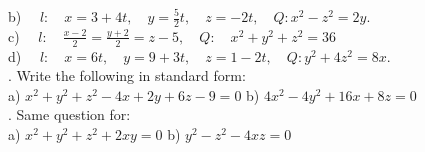 \documentclass[11pts]{amsbook}
\begin{document}
\indent b) $\quad\mathit{l}: \quad x=3+4t,\quad y=\frac{5}{2}t,\quad z=-2t,\quad Q: x^{2}-z^{2} = 2y.$ \\

\indent c) $\quad\mathit{l}:\quad \frac{x-2}{2}=\frac{y+2}{2}=z-5,\quad Q:\quad x^{2}+y^{2}+z^{2} = 36$ \\

\indent d) $\quad\mathit{l}:\quad x=6t,\quad y=9+3t, \quad z=1-2t, \quad Q:y^{2}+4z^{2}=8x.$ \\

. Write the following in standard form: \\

\indent a) $x^{2}+y^{2}+z^{2}-4x+2y+6z-9=0$ \hspace{20pt} b) $4x^{2}-4y^{2}+16x+8z=0$ \\

. Same question for: \\

\indent a) $x^{2}+y^{2}+z^{2}+2xy=0$ \hspace{77pt} b) $y^{2}-z^{2}-4xz=0$
\end{document}
